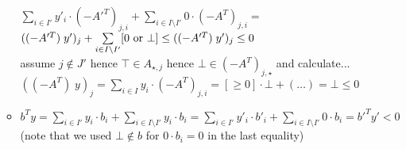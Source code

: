 \documentclass[]{article}
\begin{document}
\begin{itemize}
\begin{itemize}
	$ \sum\limits_{i \in I'} y'_i \cdot (-A'^T)_{j,i} + \sum\limits_{i \in I \setminus I'} 0 \cdot (-A^T)_{j,i} = $\\
	$ ((-A'^T)\; y')_j + \sum\limits_{i \in I \setminus I'} [0 \textup{~or~} \bot] \le ((-A'^T)\; y')_j \le 0  $\\
	assume $j \notin J'$ hence $\top \in A_{\star, j}$ hence $\bot \in (-A^T)_{j, \star}$ and calculate...
	$ ((-A^T)\; y)_j = \sum\limits_{i \in I} y_i \cdot (-A^T)_{j,i} = [\ge 0] \cdot \bot + (\dots) = \bot \le 0 $
	\item $ b^T y
	= \sum\limits_{i \in I'} y_i \cdot b_i + \sum\limits_{i \in I \setminus I'} y_i \cdot b_i
	= \sum\limits_{i \in I'} y'_i \cdot b'_i + \sum\limits_{i \in I \setminus I'} 0 \cdot b_i
	= b'^T y' < 0 $
	(note that we used $\bot \notin b$ for $0 \cdot b_i = 0$ in the last equality)
\end{itemize}
\end{itemize}
\end{document}
